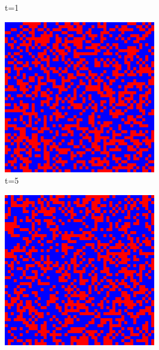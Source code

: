 \documentclass[a4paper, 11pt]{article}
\begin{document}
\begin{figure}[H]
\begin{subfigure}{.25\textwidth}
  \caption{t=1}
\end{subfigure}%
\begin{subfigure}{.25\textwidth}
  \centering
  \includegraphics[width=0.9\linewidth]{SNOWDRIFT_VON_NEUMANN_50x50_t05}
  \caption{t=5}
\end{subfigure}%
\begin{subfigure}{.25\textwidth}
  \centering
  \includegraphics[width=0.9\linewidth]{SNOWDRIFT_VON_NEUMANN_50x50_t10}

\end{subfigure}
\end{figure}
\end{document}

